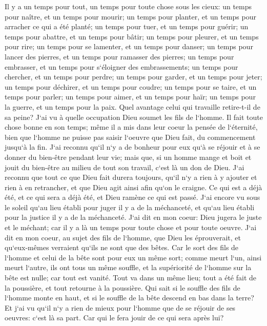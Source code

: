\verse Il y a un temps pour tout, un temps pour toute chose sous les cieux: 
\verse un temps pour naître, et un temps pour mourir; un temps pour planter, et un temps pour arracher ce qui a été planté; 
\verse un temps pour tuer, et un temps pour guérir; un temps pour abattre, et un temps pour bâtir; 
\verse un temps pour pleurer, et un temps pour rire; un temps pour se lamenter, et un temps pour danser; 
\verse un temps pour lancer des pierres, et un temps pour ramasser des pierres; un temps pour embrasser, et un temps pour s`éloigner des embrassements; 
\verse un temps pour chercher, et un temps pour perdre; un temps pour garder, et un temps pour jeter; 
\verse un temps pour déchirer, et un temps pour coudre; un temps pour se taire, et un temps pour parler; 
\verse un temps pour aimer, et un temps pour haïr; un temps pour la guerre, et un temps pour la paix. 
\verse Quel avantage celui qui travaille retire-t-il de sa peine? 
\verse J`ai vu à quelle occupation Dieu soumet les fils de l`homme. 
\verse Il fait toute chose bonne en son temps; même il a mis dans leur coeur la pensée de l`éternité, bien que l`homme ne puisse pas saisir l`oeuvre que Dieu fait, du commencement jusqu`à la fin. 
\verse J`ai reconnu qu`il n`y a de bonheur pour eux qu`à se réjouir et à se donner du bien-être pendant leur vie; 
\verse mais que, si un homme mange et boit et jouit du bien-être au milieu de tout son travail, c`est là un don de Dieu. 
\verse J`ai reconnu que tout ce que Dieu fait durera toujours, qu`il n`y a rien à y ajouter et rien à en retrancher, et que Dieu agit ainsi afin qu`on le craigne. 
\verse Ce qui est a déjà été, et ce qui sera a déjà été, et Dieu ramène ce qui est passé. 
\verse J`ai encore vu sous le soleil qu`au lieu établi pour juger il y a de la méchanceté, et qu`au lieu établi pour la justice il y a de la méchanceté. 
\verse J`ai dit en mon coeur: Dieu jugera le juste et le méchant; car il y a là un temps pour toute chose et pour toute oeuvre. 
\verse J`ai dit en mon coeur, au sujet des fils de l`homme, que Dieu les éprouverait, et qu`eux-mêmes verraient qu`ils ne sont que des bêtes. 
\verse Car le sort des fils de l`homme et celui de la bête sont pour eux un même sort; comme meurt l`un, ainsi meurt l`autre, ils ont tous un même souffle, et la supériorité de l`homme sur la bête est nulle; car tout est vanité. 
\verse Tout va dans un même lieu; tout a été fait de la poussière, et tout retourne à la poussière. 
\verse Qui sait si le souffle des fils de l`homme monte en haut, et si le souffle de la bête descend en bas dans la terre? 
\verse Et j`ai vu qu`il n`y a rien de mieux pour l`homme que de se réjouir de ses oeuvres: c`est là sa part. Car qui le fera jouir de ce qui sera après lui? 

